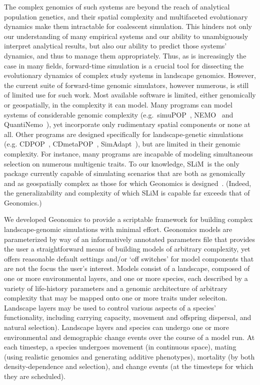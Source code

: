 ﻿\documentclass{article}
\begin{document}
The complex genomics of such systems are beyond the reach of analytical
population genetics, and their spatial complexity and multifaceted evolutionary
dynamics make them intractable for coalescent simulation.
This hinders not only our understanding of many empirical systems and our ability to
unambiguously interpret analytical results, but also our
ability to predict those systems' dynamics, and thus to manage them appropriately.
Thus, as is increasingly the case in many fields, forward-time simulation is a 
crucial tool for dissecting the evolutionary dynamics of complex study systems in landscape genomics.
However, the current suite of forward-time genomic simulators, however numerous, is still of limited use for such work.
Most available software is limited, either genomically or geospatially, in the complexity it can model.
Many programs can model systems of considerable genomic complexity
(e.g.\ simuPOP~\cite{peng}, NEMO~\cite{guillaume} and QuantiNemo~\cite{neuenschwander}),
yet incorporate only rudimentary spatial components or none at all.
Other programs are designed specifically for landscape-genetic simulations
(e.g. CDPOP~\cite{landguth}, CDmetaPOP~\cite{landguth2}, SimAdapt~\cite{rebaudo}),
but are limited in their genomic complexity.
For instance, many programs are incapable of modeling simultaneous selection on numerous multigenic traits.
To our knowledge, SLiM~\cite{messer,haller}is the only package currently capable of simulating scenarios
that are both as genomically and as geospatially complex as those for which Geonomics is designed~\cite{popgen_models}.
(Indeed, the generalizability and complexity of which SLiM is capable far exceeds that of Geonomics.)

We developed Geonomics to provide a scriptable framework for building
complex landscape-genomic simulations with minimal effort.
Geonomics models are parameterized by way of an informatively annotated parameters file
that provides the user a straightforward means of building models of arbitrary complexity, yet offers
reasonable default settings and/or `off switches' for model components
that are not the focus the user's interest.
Models consist of a landscape, composed of one or more environmental layers,
and one or more species, each described by a variety of life-history parameters
and a genomic architecture of arbitrary complexity that may be mapped onto
one or more traits under seleciton.
Landscape layers may be used to control various aspects of a species' functionality,
including carrying capacity, movement and offspring dispersal, and natural selection).
Landscape layers and species can undergo one or more environmental and demographic change events
over the course of a model run.
At each timestep, a species undergoes movement (in continuous space),
mating (using realistic genomics and generating additive phenotypes),
mortality (by both  density-dependence and selection),
and change events (at the timesteps for which they are scheduled).
\end{document}
